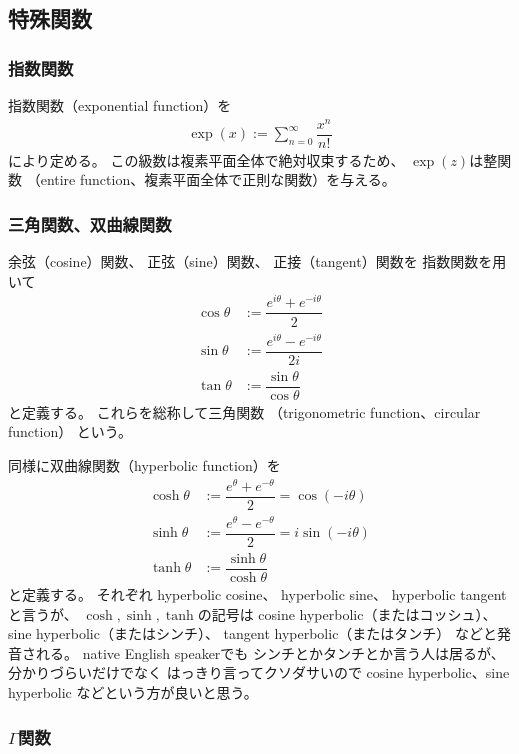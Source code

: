 \subsection{特殊関数}

\subsubsection{指数関数}

指数関数（exponential function）を
\begin{align}
    \exp(x)
    :=
    \sum_{n=0}^\infty
    \dfrac{x^n}{n!}
\end{align}
により定める。
この級数は複素平面全体で絶対収束するため、
$\exp(z)$は整関数
（entire function、複素平面全体で正則な関数）を与える。

\subsubsection{三角関数、双曲線関数}

余弦（cosine）関数、
正弦（sine）関数、
正接（tangent）関数を
指数関数を用いて
\begin{align}
    \cos\theta &:= \dfrac{e^{i\theta} + e^{-i\theta}}{2}
\\
    \sin\theta &:= \dfrac{e^{i\theta} - e^{-i\theta}}{2i}
\\
    \tan\theta &:= \dfrac{\sin\theta}{\cos\theta}
\end{align}
と定義する。
これらを総称して三角関数
（trigonometric function、circular function）
という。

同様に双曲線関数（hyperbolic function）を
\begin{align}
    \cosh\theta
    &:=
    \dfrac{e^{\theta} + e^{-\theta}}{2}
    =
    \cos(-i\theta)
\\
    \sinh\theta
    &:=
    \dfrac{e^{\theta} - e^{-\theta}}{2}
    =
    i\sin(-i\theta)
\\
    \tanh\theta
    &:=
    \dfrac{\sinh\theta}{\cosh\theta}
\end{align}
と定義する。
それぞれ
hyperbolic cosine、
hyperbolic sine、
hyperbolic tangentと言うが、
$\cosh, \sinh, \tanh$の記号は
cosine hyperbolic（またはコッシュ）、
sine hyperbolic（またはシンチ）、
tangent hyperbolic（またはタンチ）
などと発音される。
native English speakerでも
シンチとかタンチとか言う人は居るが、
分かりづらいだけでなく
はっきり言ってクソダサいので
cosine hyperbolic、sine hyperbolic
などという方が良いと思う。

\subsubsection{$\Gamma$関数}

